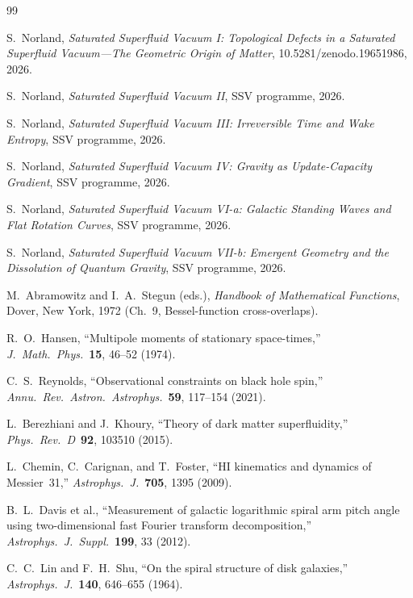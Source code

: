 \documentclass[11pt,a4paper]{article}
\begin{document}
\begin{thebibliography}{99}

S.\ Norland, \textit{Saturated Superfluid Vacuum I: Topological Defects in a Saturated
Superfluid Vacuum---The Geometric Origin of Matter},
10.5281/zenodo.19651986, 2026.

S.\ Norland, \textit{Saturated Superfluid Vacuum II}, SSV programme, 2026.

S.\ Norland, \textit{Saturated Superfluid Vacuum III: Irreversible Time and Wake Entropy},
SSV programme, 2026.

S.\ Norland, \textit{Saturated Superfluid Vacuum IV: Gravity as Update-Capacity Gradient},
SSV programme, 2026.

S.\ Norland, \textit{Saturated Superfluid Vacuum VI-a: Galactic Standing Waves and Flat
Rotation Curves}, SSV programme, 2026.

S.\ Norland, \textit{Saturated Superfluid Vacuum VII-b: Emergent Geometry and
the Dissolution of Quantum Gravity}, SSV programme, 2026.

M.\ Abramowitz and I.~A.\ Stegun (eds.),
\textit{Handbook of Mathematical Functions}, Dover, New York, 1972
(Ch.~9, Bessel-function cross-overlaps).

R.~O.\ Hansen,
``Multipole moments of stationary space-times,''
\textit{J.\ Math.\ Phys.}\ \textbf{15}, 46--52 (1974).

C.~S.\ Reynolds,
``Observational constraints on black hole spin,''
\textit{Annu.\ Rev.\ Astron.\ Astrophys.}\ \textbf{59}, 117--154 (2021).

L.\ Berezhiani and J.\ Khoury,
``Theory of dark matter superfluidity,''
\textit{Phys.\ Rev.\ D}\ \textbf{92}, 103510 (2015).

L.\ Chemin, C.\ Carignan, and T.\ Foster,
``HI kinematics and dynamics of Messier~31,''
\textit{Astrophys.\ J.}\ \textbf{705}, 1395 (2009).

B.~L.\ Davis et al.,
``Measurement of galactic logarithmic spiral arm pitch angle using two-dimensional
fast Fourier transform decomposition,''
\textit{Astrophys.\ J.\ Suppl.}\ \textbf{199}, 33 (2012).

C.~C.\ Lin and F.~H.\ Shu,
``On the spiral structure of disk galaxies,''
\textit{Astrophys.\ J.}\ \textbf{140}, 646--655 (1964).


\end{thebibliography}
\end{document}
